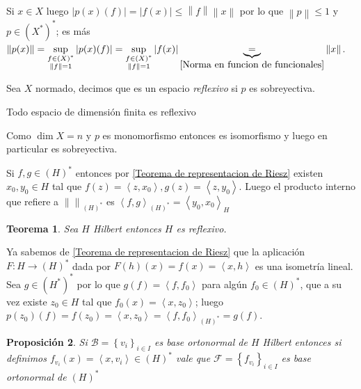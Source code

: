 \documentclass[11pt]{article}
\newcommand{\B}{\mathcal{B}}
\newcommand{\F}{\mathcal{F}}
\newcommand{\dual}[1]{\left(#1\right)^{\ast}}
\newcommand{\ddual}[1]{\left(#1^{\ast}\right)^{\ast}}
\newcommand{\norm}[1]{\left\lVert#1\right\rVert}
\newcommand{\abs}[1]{\left\lvert#1\right\rvert}
\newcommand{\ip}[1]{\left\langle#1\right\rangle}
\newcommand{\sett}[1]{\left\lbrace#1\right\rbrace}
\newtheorem{theorem}{Teorema}
\numberwithin{theorem}{subsection}
\newtheorem{proposition}[theorem]{Proposici\'on}
\newenvironment{proof}[1][Demostraci\'on]{\begin{trivlist}
		\item[\hskip \labelsep {\bfseries #1}]}{\end{trivlist}}
\newenvironment{definition}[1][Definici\'on]{\begin{trivlist}
		\item[\hskip \labelsep {\bfseries #1}]}{\end{trivlist}}
\newenvironment{example}[1][Ejemplo]{\begin{trivlist}
		\item[\hskip \labelsep {\bfseries #1 }]}{\end{trivlist}}
\newenvironment{remark}[1][Observaci\'on]{\begin{trivlist}
		\item[\hskip \labelsep {\bfseries #1}]}{\end{trivlist}}
\newcommand{\qed}{\nobreak \ifvmode \relax \else
	\ifdim\lastskip<1.5em \hskip-\lastskip
	\hskip1.5em plus0em minus0.5em \fi \nobreak
	\vrule height0.75em width0.5em depth0.25em\fi}
\begin{document}
\begin{proof}
	Si $x \in X$ luego $\abs{p(x)(f)} = \abs{f(x)} \leq \norm{f} \norm{x}$ por lo que $\norm{p} \leq 1$ y $p \in \ddual{X}$; es m\'as $\norm{p(x)} = \sup\limits_{\substack{f \in \dual{X} \\ \norm{f} = 1}}{\abs{p(x)(f)}} = \sup\limits_{\substack{f \in \dual{X} \\ \norm{f} = 1}}{\abs{f(x)}} \underbrace{=}_{\ref{Norma en funcion de funcionales}} \norm{x}$. \qed
\end{proof}

\begin{definition}
	Sea $X$ normado, decimos que es un espacio \textit{reflexivo} si $p$ es sobreyectiva.
\end{definition}

\begin{example}
	Todo espacio de dimensi\'on finita es reflexivo
\end{example}

\begin{proof}
	Como $\dim X = n$ y $p$ es monomorfismo entonces es isomorfismo y luego en particular es sobreyectiva.
\end{proof}

\begin{remark}
	Si $f,g \in \dual{H}$ entonces por \ref{Teorema de representacion de Riesz} existen $x_0,y_0 \in H$ tal que $f(z) =  \ip{z,x_0}, g(z) = \ip{z,y_0}$. Luego el producto interno que refiere a $\norm{}_{\dual{H}}$ es $\ip{f,g}_{\dual{H}} = \ip{y_0,x_0}_{H}$ 
\end{remark}

\begin{theorem}
	Sea $H$ Hilbert entonces $H$ es reflexivo.
\end{theorem}

\begin{proof}
	Ya sabemos de \ref{Teorema de representacion de Riesz} que la aplicaci\'on $F: H \rightarrow \dual{H}$ dada por $F(h)(x) = f(x) = \ip{x,h}$ es una isometr\'ia lineal. Sea $g \in \ddual{H}$ por lo que $g(f) = \ip{f,f_0}$ para alg\'un $f_0 \in \dual{H}$, que a su vez existe $z_0 \in H$ tal que $f_0(x) = \ip{x,z_0}$; luego $p(z_0)(f) = f(z_0) = \ip{x,z_0} = \ip{f,f_0}_{\dual{H}} = g(f)$.
\end{proof}

\begin{proposition}
	Si $\B = \sett{v_i}_{i \in I}$ es base ortonormal de $H$ Hilbert entonces si definimos $f_{v_i}(x) = \ip{x,v_i} \in \dual{H}$ vale que $\F = \sett{f_{v_i}}_{i \in I}$ es base ortonormal de $\dual{H}$
\end{proposition}
\end{document}
